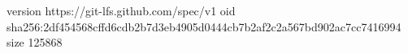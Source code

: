 version https://git-lfs.github.com/spec/v1
oid sha256:2df454568cffd6cdb2b7d3eb4905d0444cb7b2af2c2a567bd902ac7cc7416994
size 125868
